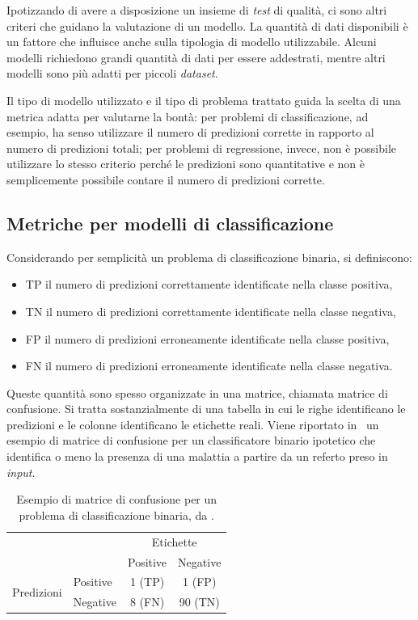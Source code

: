 Ipotizzando di avere a disposizione un insieme di \emph{test} di qualità, ci sono altri criteri che guidano la valutazione di un modello.
La quantità di dati disponibili è un fattore che influisce anche sulla tipologia di modello utilizzabile.
Alcuni modelli richiedono grandi quantità di dati per essere addestrati, mentre altri modelli sono più adatti per piccoli \emph{dataset}. 

Il tipo di modello utilizzato e il tipo di problema trattato guida la scelta di una metrica adatta per valutarne la bontà: per problemi di classificazione, ad esempio, ha senso utilizzare il numero di predizioni corrette in rapporto al numero di predizioni totali; per problemi di regressione, invece, non è possibile utilizzare lo stesso criterio perché le predizioni sono quantitative e non è semplicemente possibile contare il numero di predizioni corrette. 

\subsection{Metriche per modelli di classificazione}\label{sec:metriche_valutazione_modelli}
Considerando per semplicità un problema di classificazione binaria, si definiscono:
\begin{itemize}
    \item TP il numero di predizioni correttamente identificate nella classe positiva,
    \item TN il numero di predizioni correttamente identificate nella classe negativa,
    \item FP il numero di predizioni erroneamente identificate nella classe positiva,
    \item FN il numero di predizioni erroneamente identificate nella classe negativa.
\end{itemize}
Queste quantità sono spesso organizzate in una matrice, chiamata matrice di confusione. 
Si tratta sostanzialmente di una tabella in cui le righe identificano le predizioni e le colonne identificano le etichette reali. 
Viene riportato in~ un esempio di matrice di confusione per un classificatore binario ipotetico che identifica o meno la presenza di una malattia a partire da un referto preso in \emph{input}.
\begin{table}[h]
    \centering
    \begin{tabular}{l|l|c|c|}
        \multicolumn{2}{c}{}&\multicolumn{2}{c}{Etichette}\\
        \cline{3-4}
        \multicolumn{2}{c|}{} & Positive & Negative\\
        \cline{2-4}
        \multirow{2}{*}{Predizioni}& Positive & 1 (TP) & 1 (FP) \\
        \cline{2-4}
        & Negative & 8 (FN) & 90 (TN) \\
        \cline{2-4}
    \end{tabular}
    \caption[Esempio di matrice di confusione per un problema di classificazione binaria]{Esempio di matrice di confusione per un problema di classificazione binaria, da \protect\footnotemark.}
    \label{tab:matrice_confusione}
\end{table}


